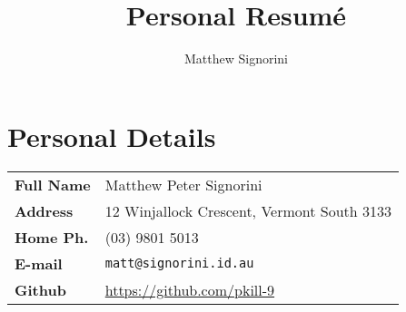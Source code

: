 \documentclass[a4paper]{article}
\title{Personal Resum\'e}
\author{Matthew Signorini}
\begin{document}
\maketitle

\section{Personal Details}
\begin{tabular}{>{\raggedright}m{3cm} l}
    \textbf{Full Name} &Matthew Peter Signorini\\
 \textbf{Address} &12 Winjallock Crescent, Vermont South 3133\\
\textbf{Home Ph.} &(03) 9801 5013\\
    \textbf{E-mail} &\texttt{matt@signorini.id.au}\\
    \textbf{Github} &\url{https://github.com/pkill-9}
\end{tabular}
\end{document}
